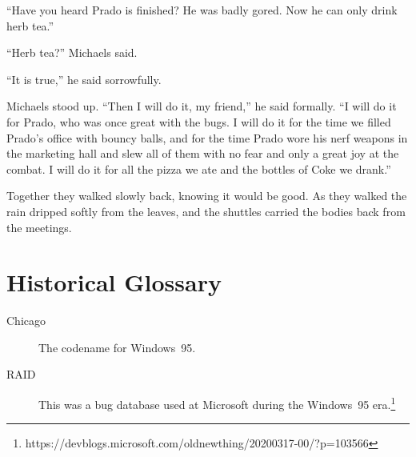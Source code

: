 \documentclass[12pt,letterpaper]{article}
\begin{document}
``Have you heard Prado is finished? He was badly gored. Now he can only
drink herb tea.''

``Herb tea?'' Michaels said.

``It is true,'' he said sorrowfully.

Michaels stood up. ``Then I will do it, my friend,'' he said
formally. ``I will do it for Prado, who was once great with the bugs. I
will do it for the time we filled Prado's office with bouncy balls,
and for the time Prado wore his nerf weapons in the marketing hall and
slew all of them with no fear and only a great joy at the combat. I
will do it for all the pizza we ate and the bottles of Coke we drank.''

Together they walked slowly back, knowing it would be good. As they
walked the rain dripped softly from the leaves, and the shuttles
carried the bodies back from the meetings.

\section*{Historical Glossary}
\begin{description}
\item[Chicago] The codename for Windows~95.
\item[RAID] This was a bug database used at Microsoft during the Windows~95
era.\footnote{https://devblogs.microsoft.com/oldnewthing/20200317-00/?p=103566}
\end{description}
\end{document}
